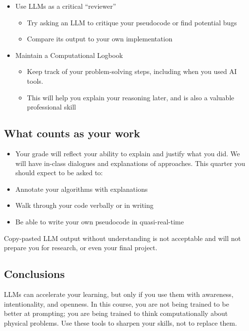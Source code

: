 \documentclass[12pt]{article}
\begin{document}
\begin{itemize}
    \item Use LLMs as a critical ``reviewer''
    \begin{itemize}
      \item Try asking an LLM to critique your pseudocode or find potential bugs
      \item Compare its output to your own implementation
    \end{itemize}
    
    \item Maintain a Computational Logbook
    \begin{itemize}
      \item Keep track of your problem-solving steps, including when you used AI tools.
      \item This will help you explain your reasoning later, and is also a valuable professional skill
    \end{itemize}

  \end{itemize}


\subsection*{What counts as your work}

    \begin{itemize}
      
      \item Your grade will reflect your ability to explain and justify what you did. We will have in-class dialogues and explanations of approaches. This quarter you should expect to be asked to:

      \item Annotate your algorithms with explanations

      \item Walk through your code verbally or in writing

      \item Be able to write your own pseudocode in quasi-real-time

    \end{itemize}

Copy-pasted LLM output without understanding is not acceptable and will not prepare you for research, or even your final project.


\subsection*{Conclusions}

LLMs can accelerate your learning, but only if you use them with awareness, intentionality, and openness. In this course, you are not being trained to be better at prompting; you are being trained to think computationally about physical problems. Use these tools to sharpen your skills, not to replace them.
\end{document}
